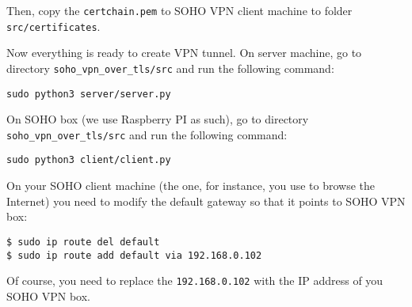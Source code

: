 Then, copy the \texttt{certchain.pem} to SOHO VPN client machine
to folder \texttt{src/certificates}.

Now everything is ready to create VPN tunnel. 
On server machine, go to directory 
\texttt{soho\_vpn\_over\_tls/src} and run the 
following command:

\texttt{sudo python3 server/server.py}

On SOHO box (we use Raspberry PI as such), go to directory 
\texttt{soho\_vpn\_over\_tls/src} and run the following command:

\texttt{sudo python3 client/client.py}

On your SOHO client machine (the one, for instance, you use 
to browse the Internet) you need to modify the default gateway
so that it points to SOHO VPN box: 

\begin{verbatim}
$ sudo ip route del default
$ sudo ip route add default via 192.168.0.102
\end{verbatim}

Of course, you need to replace the \texttt{192.168.0.102}
with the IP address of you SOHO VPN box.